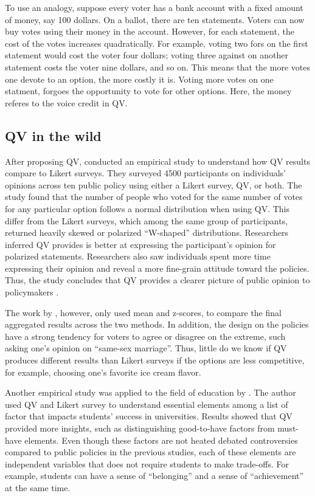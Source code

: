 To use an analogy,
suppose every voter has a bank account 
with a fixed amount of money, say 100 dollars.
On a ballot, there are ten statements.
Voters can now buy votes using their money in the account.
However, for each statement, the cost of the votes
increases quadratically. 
For example, voting two fors on the first statement 
would cost the voter four dollars;
voting three against on another statement 
costs the voter nine dollars, and so on.
This means that the more votes one devote to an option,
the more costly it is.
Voting more votes on one statment, 
forgoes the opportunity to vote for other options.
Here, the money referes to the voice credit in QV.

\subsection{QV in the wild}
After proposing QV,
\textcite{quarfoot2017quadratic} conducted an 
empirical study to understand how 
QV results compare to Likert surveys.
They surveyed 4500 participants 
on individuals' opinions
across ten public policy
using either a Likert survey, QV, or both.
The study found that the number of people
who voted for the same number of votes
for any particular option 
follows a normal distribution when using QV.
This differ from the Likert surveys,
which among the same group of participants,
returned heavily skewed 
or polarized ``W-shaped'' distributions.
Researchers inferred 
QV provides is better at expressing the participant's opinion
for polarized statements.
Researchers also saw individuals 
spent more time expressing their opinion
and reveal a more fine-grain attitude 
toward the policies.
Thus, the study concludes that 
QV provides a clearer picture 
of public opinion to policymakers
\cite{quarfoot2017quadratic}.

The work by \textcite{quarfoot2017quadratic}, however,
only used mean and z-scores,
to compare the final aggregated results 
across the two methods.
In addition, 
the design on the policies 
have a strong tendency for voters
to agree or disagree on the extreme,
such asking one's opinion on ``same-sex marriage''.
Thus, little do we know if
QV produces different results 
than Likert surveys
if the options are less competitive,
for example, choosing one's favorite ice cream flavor.\par

Another empirical study was applied to 
the field of education 
by \textcite{naylor2017first}. 
The author used QV and Likert survey
to understand essential elements 
among a list of factor
that impacts students' success in universities.
Results showed that QV provided more insights, 
such as distinguishing good-to-have factors from must-have elements.
Even though these factors are not heated debated controversies
compared to public policies in the previous studies, 
each of these elements are independent variables
that does not require students to make trade-offs.
For example, students can have a sense of ``belonging'' and
a sense of ``achievement'' at the same time.

